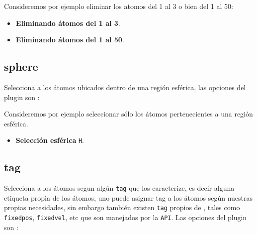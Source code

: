 
Consideremos por ejemplo eliminar los atomos del 1 al 3 o bien del 1 al 50:

\begin{itemize}
 \item \textbf{Eliminando \'atomos del 1 al 3}.
 \item \textbf{Eliminando \'atomos del 1 al 50}.
\end{itemize}

\subsection{sphere}
Selecciona a los \'atomos ubicados dentro de una regi\'on esf\'erica, las
opciones del plugin son :


Consideremos por ejemplo seleccionar s\'olo los \'atomos pertenecientes a una
regi\'on esf\'erica.

\begin{itemize}
 \item \textbf{Selecci\'on esf\'erica} \texttt{H}.
\end{itemize}

\subsection{tag}
Selecciona a los \'atomos segun alg\'un \verb|tag| que los caracterize, es decir
alguna etiqueta propia de los \'atomos, uno puede asignar tag a los \'atomos
seg\'un nuestras propias necesidades, sin embargo tambi\'en existen \verb|tag|
propios de {\lpmd}, tales como \verb|fixedpos|, \verb|fixedvel|, etc que son
manejados por la \verb|API|. Las opciones del plugin son :


